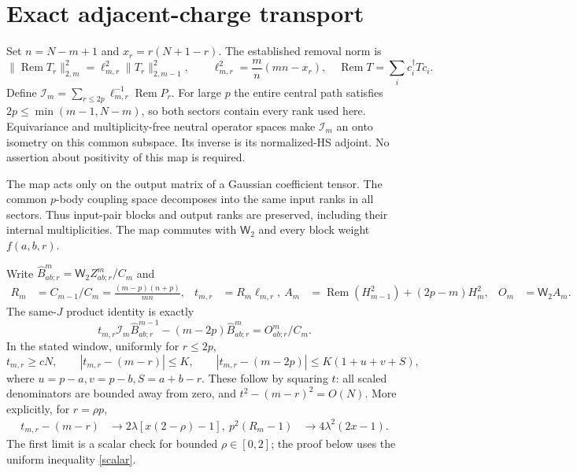 \documentclass[11pt,a4paper]{article}
\newcommand{\Rem}{\operatorname{Rem}}
\newcommand{\W}{\mathsf W_2}
\newcommand{\Id}{\mathcal I}
\begin{document}
\newpage
\section{Exact adjacent-charge transport}
Set $n=N-m+1$ and $x_r=r(N+1-r)$. The established removal norm is
\begin{equation}
 \|\Rem T_r\|_{2,m}^2=\ell_{m,r}^2\|T_r\|_{2,m-1}^2,
 \qquad \ell_{m,r}^2=\frac m n(mn-x_r),\quad
 \Rem T=\sum_i c_i^\dagger T c_i.\label{rem}
\end{equation}
Define $\Id_m=\sum_{r\le2p}\ell_{m,r}^{-1}\Rem P_r$.
For large $p$ the entire central path satisfies
$2p\le\min(m-1,N-m)$, so both sectors contain every rank used here.
Equivariance and multiplicity-free neutral operator spaces make
$\Id_m$ an onto isometry on this common subspace. Its inverse is
its normalized-HS adjoint. No assertion about positivity of this
map is required.

The map acts only on the output matrix of a Gaussian coefficient
tensor. The common $p$-body coupling space decomposes into the same
input ranks in all sectors. Thus input-pair blocks and output ranks
are preserved, including their internal multiplicities. The map
commutes with $\W$ and every block weight $f(a,b,r)$.

Write $\widehat B^m_{ab;r}=\W Z^m_{ab;r}/C_m$ and
\begin{align}
 R_m&=C_{m-1}/C_m=\frac{(m-p)(n+p)}{mn},&t_{m,r}&=R_m\ell_{m,r},\
 A_m&=\Rem(H_{m-1}^2)+(2p-m)H_m^2,&O_m&=\W A_m.
\end{align}
The same-$J$ product identity is exactly
\begin{equation}
 t_{m,r}\Id_m\widehat B^{m-1}_{ab;r}-(m-2p)\widehat B^m_{ab;r}
       =O^m_{ab;r}/C_m.\label{identity}
\end{equation}
In the stated window, uniformly for $r\le2p$,
\begin{equation}
 t_{m,r}\ge cN,\qquad |t_{m,r}-(m-r)|\le K,\qquad
 |t_{m,r}-(m-2p)|\le K(1+u+v+S),\label{scalar}
\end{equation}
where $u=p-a,v=p-b,S=a+b-r$. These follow by squaring $t$:
all scaled denominators are bounded away from zero, and
$t^2-(m-r)^2=O(N)$. More explicitly, for $r=\rho p$,
\begin{align}
 t_{m,r}-(m-r)&\longrightarrow2\lambda[x(2-\rho)-1],\
 p^2(R_m-1)&\longrightarrow4\lambda^2(2x-1).
\end{align}
The first limit is a scalar check for bounded $\rho\in[0,2]$;
the proof below uses the uniform inequality \eqref{scalar}.
\end{document}
